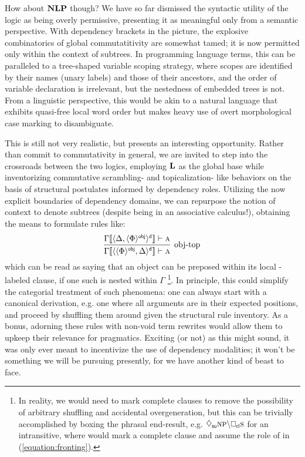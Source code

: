 How about $\textbf{NLP}$ though?
We have so far dismissed the syntactic utility of the logic as being overly permissive, presenting it as meaningful only from a semantic perspective.
With dependency brackets in the picture, the explosive combinatorics of global commutatitivity are somewhat tamed; it is now permitted only within the context of subtrees.
In programming language terms, this can be paralleled to a tree-shaped variable scoping strategy, where scopes are identified by their names (unary labels) and those of their ancestors, and the order of variable declaration is irrelevant, but the nestedness of embedded trees is not.
From a linguistic perspective, this would be akin to a natural language that exhibits quasi-free local word order but makes heavy use of overt morphological case marking to disambiguate.

This is still not very realistic, but presents an interesting opportunity.
Rather than commit to commutativity in general, we are invited to step into the crossroads between the two logics, employing $\textbf{L}$ as the global base while inventorizing commutative scrambling- and topicalization- like behaviors on the basis of structural postulates informed by dependency roles.
Utilizing the now explicit boundaries of dependency domains, we can repurpose the notion of context to denote subtrees (despite being in an associative calculus!), obtaining the means to formulate rules like:
\begin{equation}\label{equation:fronting}
	\infer[\text{obj-top}]
		{\Gamma\ctx{\dbra{\dbra{\Phi}{obj},\Delta}{d}} \vdash \prop{a}}
		{\Gamma\ctx{\dbra{\Delta, \dbra{\Phi}{obj}}{d}} \vdash \prop{a}}
\end{equation}
which can be read as saying that an object can be preposed within its local -labeled clause, if one such is nested within $\Gamma$%
	\footnote{In reality, we would need to mark complete clauses to remove the possibility of arbitrary shuffling and accidental overgeneration, but this can be trivially accomplished by boxing the phrasal end-result, e.g. $\ddia{su}\np[s]\divleft\dbox{cl}{\s[s]}$ for an intransitive, where  would mark a complete clause and assume the role of  in (\ref{equation:fronting}).}.	
In principle, this could simplify the categorial treatment of such phenomena: one can always start with a canonical derivation, e.g. one where all arguments are in their expected positions, and proceed by shuffling them around given the structural rule inventory.
As a bonus, adorning these rules with non-void term rewrites would allow them to upkeep their relevance for pragmatics.
Exciting (or not) as this might sound, it was only ever meant to incentivize the use of dependency modalities; it won't be something we will be pursuing presently, for we have another kind of beast to face.


